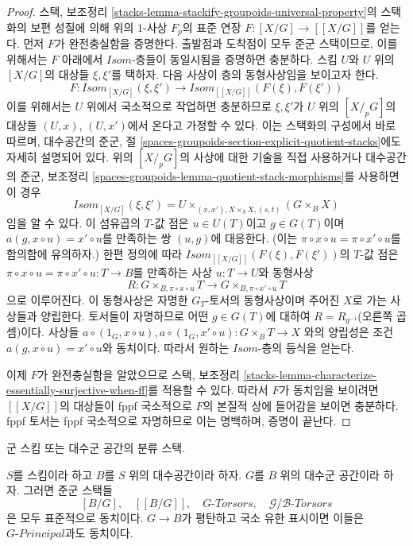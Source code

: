 \begin{proof}
\medskip\noindent
스택, 보조정리 \ref{stacks-lemma-stackify-groupoids-universal-property}의
스택화의 보편 성질에 의해 위의 $1$-사상 $F_p$의 표준 연장
$F : [X/G] \to [[X/G]]$를 얻는다. 먼저 $F$가 완전충실함을 증명한다.
출발점과 도착점이 모두 준군 스택이므로, 이를 위해서는 $F$ 아래에서
$\mathit{Isom}$-층들이 동일시됨을 증명하면 충분하다. 스킴 $U$와 $U$ 위의
$[X/G]$의 대상들 $\xi, \xi'$를 택하자. 다음 사상이 층의 동형사상임을
보이고자 한다.
$$
F :
\mathit{Isom}_{[X/G]}(\xi, \xi')
\longrightarrow
\mathit{Isom}_{[[X/G]]}(F(\xi), F(\xi'))
$$
이를 위해서는 $U$ 위에서 국소적으로 작업하면 충분하므로
$\xi, \xi'$가 $U$ 위의 $[X/_{\!p}G]$의 대상들 $(U, x)$, $(U, x')$에서
온다고 가정할 수 있다. 이는 스택화의 구성에서 바로 따르며, 대수공간의
준군, 절 \ref{spaces-groupoids-section-explicit-quotient-stacks}에도 자세히
설명되어 있다. 위의 $[X/_{\!p}G]$의 사상에 대한 기술을 직접 사용하거나
대수공간의 준군, 보조정리
\ref{spaces-groupoids-lemma-quotient-stack-morphisms}를 사용하면 이 경우
$$
\mathit{Isom}_{[X/G]}(\xi, \xi') =
U \times_{(x, x'), X \times_S X, (s, t)} (G \times_B X)
$$
임을 알 수 있다. 이 섬유곱의 $T$-값 점은 $u \in U(T)$이고
$g \in G(T)$이며 $a(g, x \circ u) = x' \circ u$를 만족하는 쌍 $(u, g)$에
대응한다. (이는 $\pi \circ x \circ u = \pi \circ x' \circ u$를 함의함에
유의하자.) 한편 정의에 따라
$\mathit{Isom}_{[[X/G]]}(F(\xi), F(\xi'))$의 $T$-값 점은
$\pi \circ x \circ u = \pi \circ x' \circ u : T \to B$를 만족하는 사상
$u : T \to U$와 동형사상
$$
R :
G \times_{B, \pi \circ x \circ u} T
\longrightarrow
G \times_{B, \pi \circ x' \circ u} T
$$
으로 이루어진다. 이 동형사상은 자명한 $G_T$-토서의 동형사상이며 주어진
$X$로 가는 사상들과 양립한다. 토서들이 자명하므로 어떤 $g \in G(T)$에
대하여 $R = R_{g^{-1}}$(오른쪽 곱셈)이다. 사상들
$a \circ (1_G, x \circ u), a \circ (1_G, x' \circ u) : G \times_B T \to X$
와의 양립성은 조건 $a(g, x \circ u) = x' \circ u$와 동치이다. 따라서
원하는 $\mathit{Isom}$-층의 등식을 얻는다.

\medskip\noindent
이제 $F$가 완전충실함을 알았으므로 스택, 보조정리
\ref{stacks-lemma-characterize-essentially-surjective-when-ff}를 적용할 수
있다. 따라서 $F$가 동치임을 보이려면 $[[X/G]]$의 대상들이 fppf 국소적으로
$F$의 본질적 상에 들어감을 보이면 충분하다. fppf 토서는 fppf 국소적으로
자명하므로 이는 명백하며, 증명이 끝난다.
\end{proof}

\begin{lemma}
\label{lemma-classifying-stacks}
\begin{slogan}
군 스킴 또는 대수군 공간의 분류 스택.
\end{slogan}
$S$를 스킴이라 하고 $B$를 $S$ 위의 대수공간이라 하자. $G$를 $B$ 위의
대수군 공간이라 하자. 그러면 준군 스택들
$$
[B/G],\quad
[[B/G]],\quad
G\textit{-Torsors},\quad
\mathcal{G}/\mathcal{B}\textit{-Torsors}
$$
은 모두 표준적으로 동치이다. $G \to B$가 평탄하고 국소 유한 표시이면
이들은 $G\textit{-Principal}$과도 동치이다.
\end{lemma}

